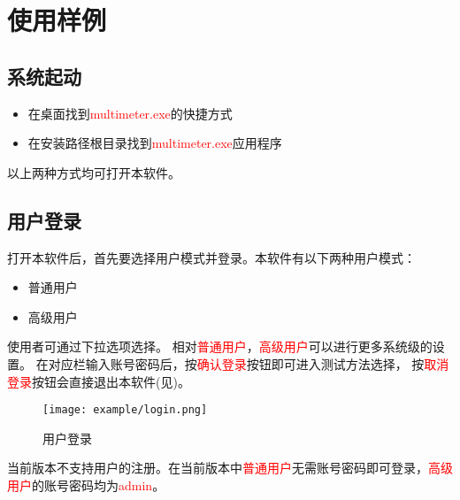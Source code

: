 \chapter{使用样例\label{ch:excample}}
\section{系统起动}
\begin{itemize}
	\item 在桌面找到\textcolor{red}{multimeter.exe}的快捷方式
	\item 在安装路径根目录找到\textcolor{red}{multimeter.exe}应用程序
\end{itemize}
以上两种方式均可打开本软件。
\section{用户登录\label{subsec:Advance}}
打开本软件后，首先要选择用户模式并登录。本软件有以下两种用户模式：
\begin{itemize}
	\item 普通用户
	\item 高级用户
\end{itemize}
使用者可通过下拉选项选择。
相对\textcolor{red}{普通用户}，\textcolor{red}{高级用户}可以进行更多系统级的设置。
在对应栏输入账号密码后，按\textcolor{red}{确认登录}按钮即可进入测试方法选择，
按\textcolor{red}{取消登录}按钮会直接退出本软件(见)。
\begin{figure}[H]
	\centering
	\texttt{[image: example/login.png]}
	\caption{ 用户登录 \label{fig:exmp_login}}
\end{figure}
\begin{tips}
	当前版本不支持用户的注册。在当前版本中\textcolor{red}{普通用户}无需账号密码即可登录，\textcolor{red}{高级用户}的账号密码均为\textcolor{red}{admin}。
\end{tips}






